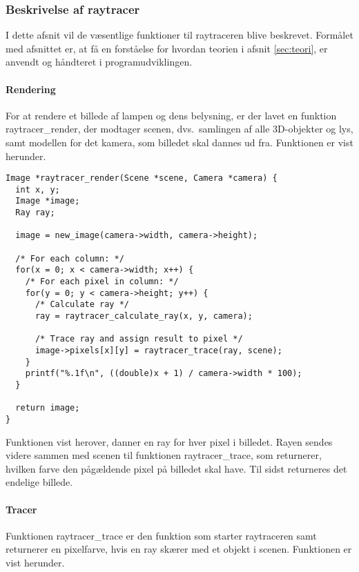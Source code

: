 \subsubsection{Beskrivelse af raytracer}
I dette afsnit vil de væsentlige funktioner til raytraceren blive beskrevet. Formålet med afsnittet er, at få en forståelse for hvordan teorien i afsnit \ref{sec:teori}, er anvendt og håndteret i programudviklingen.


\paragraph{Rendering}
For at rendere et billede af lampen og dens belysning, er der lavet en funktion raytracer\_render, der modtager scenen, dvs.\ samlingen af alle 3D-objekter og lys, samt modellen for det kamera, som billedet skal dannes ud fra. Funktionen er vist herunder.

\begin{lstlisting}[style=Cstyle, caption=Funktionen, der rendere billedet af scenen med et kameras perspektiv]
Image *raytracer_render(Scene *scene, Camera *camera) {
  int x, y;
  Image *image;
  Ray ray;

  image = new_image(camera->width, camera->height);
  
  /* For each column: */
  for(x = 0; x < camera->width; x++) {
    /* For each pixel in column: */
    for(y = 0; y < camera->height; y++) {
      /* Calculate ray */
      ray = raytracer_calculate_ray(x, y, camera);
      
      /* Trace ray and assign result to pixel */
      image->pixels[x][y] = raytracer_trace(ray, scene);
    }
    printf("%.1f\n", ((double)x + 1) / camera->width * 100);
  }

  return image;
}
\end{lstlisting}

Funktionen vist herover, danner en ray for hver pixel i billedet. Rayen sendes videre sammen med scenen til funktionen raytracer\_trace, som returnerer, hvilken farve den pågældende pixel på billedet skal have. Til sidst returneres det endelige billede.

\paragraph{Tracer}
Funktionen raytracer\_trace er den funktion som starter raytraceren samt returnerer en pixelfarve, hvis en ray skærer med et objekt i scenen. Funktionen er vist herunder.  

